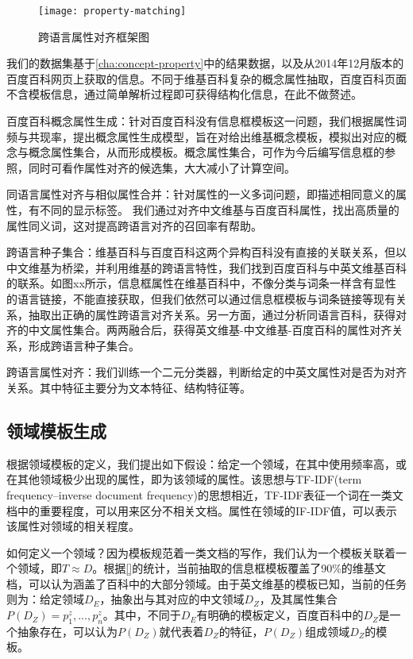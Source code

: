 \begin{figure}[H]
  \centering
  \texttt{[image: property-matching]}
  \caption{跨语言属性对齐框架图}
  \label{fig:property-matching}
\end{figure}

我们的数据集基于\ref{cha:concept-property}中的结果数据，以及从2014年12月版本的百度百科网页上获取的信息。不同于维基百科复杂的概念属性抽取，百度百科页面不含模板信息，通过简单解析过程即可获得结构化信息，在此不做赘述。

{\heiti 百度百科概念属性生成：}针对百度百科没有信息框模板这一问题，我们根据属性词频与共现率，提出概念属性生成模型，旨在对给出维基概念模板，模拟出对应的概念与概念属性集合，从而形成模板。概念属性集合，可作为今后编写信息框的参照，同时可看作属性对齐的候选集，大大减小了计算空间。

{\heiti 同语言属性对齐与相似属性合并：}针对属性的一义多词问题，即描述相同意义的属性，有不同的显示标签。
我们通过对齐中文维基与百度百科属性，找出高质量的属性同义词，这对提高跨语言对齐的召回率有帮助。

{\heiti 跨语言种子集合：}维基百科与百度百科这两个异构百科没有直接的关联关系，但以中文维基为桥梁，并利用维基的跨语言特性，我们找到百度百科与中英文维基百科的联系。如图xx所示，信息框属性在维基百科中，不像分类与词条一样含有显性的语言链接，不能直接获取，但我们依然可以通过信息框模板与词条链接等现有关系，抽取出正确的属性跨语言对齐关系。另一方面，通过分析同语言百科，获得对齐的中文属性集合。两两融合后，获得英文维基-中文维基-百度百科的属性对齐关系，形成跨语言种子集合。

{\heiti 跨语言属性对齐：}我们训练一个二元分类器，判断给定的中英文属性对是否为对齐关系。其中特征主要分为文本特征、结构特征等。

\subsection{领域模板生成}
\label{sec:domain-template}
根据领域模板的定义，我们提出如下假设：给定一个领域，在其中使用频率高，或在其他领域极少出现的属性，即为该领域的属性。该思想与TF-IDF(term frequency–inverse document frequency)的思想相近，TF-IDF表征一个词在一类文档中的重要程度，可以用来区分不相关文档。属性在领域的IF-IDF值，可以表示该属性对领域的相关程度。

如何定义一个领域？因为模板规范着一类文档的写作，我们认为一个模板关联着一个领域，即$T \approx D$。根据\ref{}的统计，当前抽取的信息框模板覆盖了90\%的维基文档，可以认为涵盖了百科中的大部分领域。由于英文维基的模板已知，当前的任务则为：给定领域$D_E$，抽象出与其对应的中文领域$D_Z$，及其属性集合$P(D_Z)={p_1^z,...,p_n^z}$。其中，不同于$D_E$有明确的模板定义，百度百科中的$D_Z$是一个抽象存在，可以认为$P(D_Z)$就代表着$D_Z$的特征，$P(D_Z)$组成领域$D_Z$的模板。

